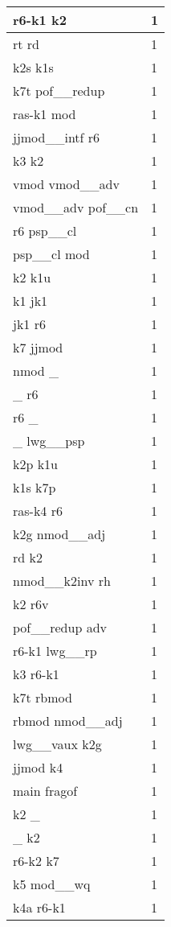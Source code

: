 \documentclass[a4 paper]{article}
\begin{document}
\begin{longtable}{p{}p{}}
r6-k1 k2  & 1 \\ \midrule
rt rd  & 1 \\ \midrule
k2s k1s  & 1 \\ \midrule
k7t pof\_\_redup  & 1 \\ \midrule
ras-k1 mod  & 1 \\ \midrule
jjmod\_\_intf r6  & 1 \\ \midrule
k3 k2  & 1 \\ \midrule
vmod vmod\_\_adv  & 1 \\ \midrule
vmod\_\_adv pof\_\_cn  & 1 \\ \midrule
r6 psp\_\_cl  & 1 \\ \midrule
psp\_\_cl mod  & 1 \\ \midrule
k2 k1u  & 1 \\ \midrule
k1 jk1  & 1 \\ \midrule
jk1 r6  & 1 \\ \midrule
k7 jjmod  & 1 \\ \midrule
nmod \_  & 1 \\ \midrule
\_ r6  & 1 \\ \midrule
r6 \_  & 1 \\ \midrule
\_ lwg\_\_psp  & 1 \\ \midrule
k2p k1u  & 1 \\ \midrule
k1s k7p  & 1 \\ \midrule
ras-k4 r6  & 1 \\ \midrule
k2g nmod\_\_adj  & 1 \\ \midrule
rd k2  & 1 \\ \midrule
nmod\_\_k2inv rh  & 1 \\ \midrule
k2 r6v  & 1 \\ \midrule
pof\_\_redup adv  & 1 \\ \midrule
r6-k1 lwg\_\_rp  & 1 \\ \midrule
k3 r6-k1  & 1 \\ \midrule
k7t rbmod  & 1 \\ \midrule
rbmod nmod\_\_adj  & 1 \\ \midrule
lwg\_\_vaux k2g  & 1 \\ \midrule
jjmod k4  & 1 \\ \midrule
main fragof  & 1 \\ \midrule
k2 \_  & 1 \\ \midrule
\_ k2  & 1 \\ \midrule
r6-k2 k7  & 1 \\ \midrule
k5 mod\_\_wq  & 1 \\ \midrule
k4a r6-k1  & 1 \\ \midrule

\end{longtable}
\end{document}
